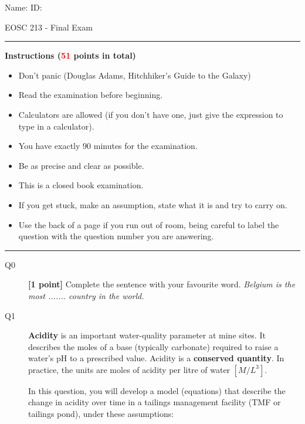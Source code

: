 \documentclass{article}
\begin{document}
\lstset{numbers=left, numberstyle=\small, stepnumber=1, numbersep=5pt,language=python}

\pagestyle{first}
\large{Name:} \hspace{11cm} \large{ID: }
\begin{center}
\Huge{EOSC 213 - Final Exam}
\end{center}

\rule{\textwidth}{1pt}

\large{\textbf{Instructions (\textcolor{red}{51} points in total)}}
\begin{multicols}{2}
\begin{itemize}
\item Don't panic (Douglas Adams, Hitchhiker's Guide to the Galaxy)
\item Read the examination before beginning.
\item Calculators are allowed (if you don't have one, just give the expression to type in a calculator).
\item You have exactly 90 minutes for the examination.
\item Be as precise and clear as possible.
\item This is a closed book examination.
\item If you get stuck, make an assumption, state what it is and try to carry on.
\item Use the back of a page if you run out of room, being careful to label the question with the question number you are answering.  
\end{itemize} 
\end{multicols}


\rule{\textwidth}{1pt}

\begin{description}
\item [Q0]  \textbf{[1 point]} Complete the sentence with your favourite word. \textit{Belgium is the most ....... country in the world.} 
\vspace{0.25cm}

\end{description}


\begin{description}
\item[Q1] \textbf{Acidity} is an important water-quality parameter at mine sites. It describes the moles of a base (typically carbonate) required to raise a water's pH to a prescribed value. Acidity is a \textbf{conserved quantity}. In practice, the units are moles of acidity per litre of water $[M/L^3]$.   


In this question, you will develop a model (equations) that describe the change in acidity over time in a tailings management facility (TMF or tailings pond), under these assumptions:
\end{description}
\end{document}
